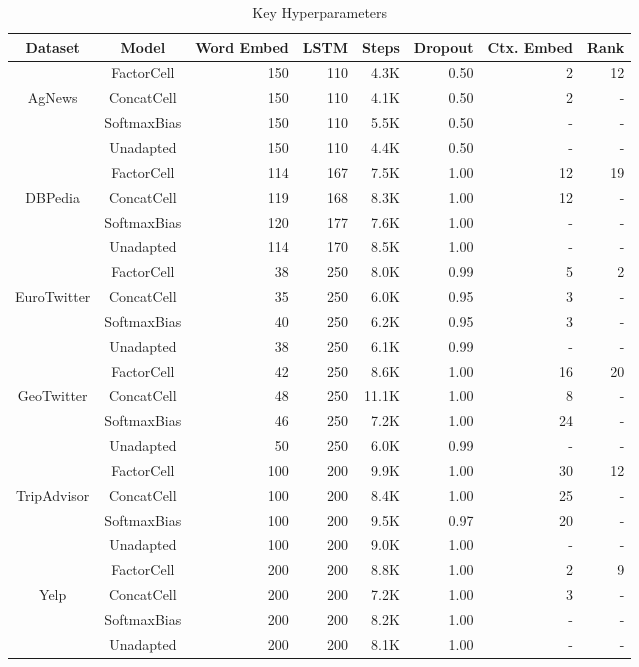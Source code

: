 \begin{table*}[]
\centering
\begin{tabular}{ccrrrrrr}
\textbf{Dataset} & \textbf{Model} & \textbf{Word Embed} & \textbf{LSTM} & \textbf{Steps} & \textbf{Dropout} & \textbf{Ctx. Embed} & \textbf{Rank} \\ \hline 
\hline
 & FactorCell & 150 & 110 & 4.3K & 0.50 & 2 & 12 \\
 AgNews & ConcatCell & 150 & 110 & 4.1K & 0.50 & 2 & - \\
 & SoftmaxBias & 150 & 110 & 5.5K & 0.50 & - & - \\
 & Unadapted & 150 & 110 & 4.4K & 0.50 & - & - \\
\hline
 & FactorCell & 114 & 167 & 7.5K & 1.00 & 12 & 19 \\
 DBPedia & ConcatCell & 119 & 168 & 8.3K & 1.00 & 12 & - \\
 & SoftmaxBias & 120 & 177 & 7.6K & 1.00 & - & - \\
 & Unadapted & 114 & 170 & 8.5K & 1.00 & - & - \\
\hline
 & FactorCell & 38 & 250 & 8.0K & 0.99 & 5 & 2 \\
EuroTwitter & ConcatCell & 35 & 250 & 6.0K & 0.95 & 3 & - \\
 & SoftmaxBias & 40 & 250 & 6.2K & 0.95 & 3 & - \\
 & Unadapted & 38 & 250 & 6.1K & 0.99 & - & - \\
\hline
 & FactorCell & 42 & 250 & 8.6K & 1.00 & 16 & 20 \\
GeoTwitter & ConcatCell & 48 & 250 & 11.1K & 1.00 & 8 & - \\
 & SoftmaxBias & 46 & 250 & 7.2K & 1.00 & 24 & - \\
 & Unadapted & 50 & 250 & 6.0K & 0.99 & - & - \\
\hline
 & FactorCell & 100 & 200 & 9.9K & 1.00 & 30 & 12 \\
TripAdvisor & ConcatCell & 100 & 200 & 8.4K & 1.00 & 25 & - \\
 & SoftmaxBias & 100 & 200 & 9.5K & 0.97 & 20 & - \\
 & Unadapted & 100 & 200 & 9.0K & 1.00 & - & - \\
\hline
 & FactorCell & 200 & 200 & 8.8K & 1.00 & 2 & 9 \\
Yelp & ConcatCell & 200 & 200 & 7.2K & 1.00 & 3 & - \\
 & SoftmaxBias & 200 & 200 & 8.2K & 1.00 & - & - \\
 & Unadapted & 200 & 200 & 8.1K & 1.00 & - & - \\
\end{tabular}
\caption{Key Hyperparameters}
\label{table:hyperparams}
\end{table*}
